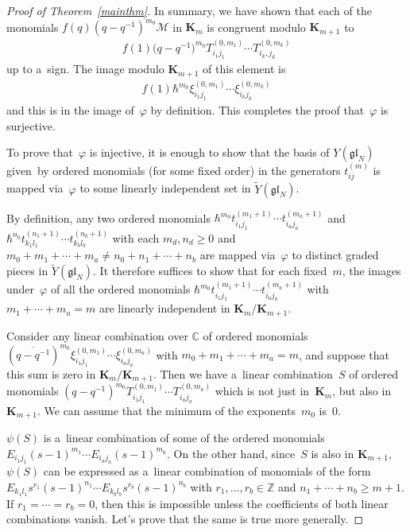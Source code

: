 \documentclass[11pt]{article}
\numberwithin{theorem}{section}
\numberwithin{proposition}{section}
\numberwithin{lemma}{section}
\numberwithin{corollary}{section}
\numberwithin{definition}{section}
\numberwithin{example}{section}
\numberwithin{remark}{section}
\numberwithin{note}{section}
\numberwithin{equation}{section}
\begin{document}
\begin{proof}[Proof of Theorem~\ref{mainthm}]
In summary, we have shown that each of the monomials $f(q)(q-q^{-1})^{m_0}\mathcal{M}$ in $\mathbf{K}_m$ is congruent
modulo $\mathbf{K}_{m+1}$ to
\begin{gather*}
f(1)\big(q-q^{-1}\big)^{m_0} T_{i_1 j_1}^{(0,m_1)} \cdots T_{i_k,j_k}^{(0,m_k)}
\end{gather*}
up to a~sign.
The image modulo $\mathbf{K}_{m+1}$ of this element is
\begin{gather*}
f(1)\hbar^{m_0}\xi_{i_1 j_1}^{(0,m_1)} \cdots \xi_{i_k j_k}^{(0,m_k)}
\end{gather*}
and this is in the image of~$\varphi$ by def\/inition.
This completes the proof that~$\varphi$ is surjective.

To prove that~$\varphi$ is injective, it is enough to show that the basis of $Y(\mathfrak{gl}_N)$ given~by
ordered monomials (for some f\/ixed order) in the generators $t_{ij}^{(m)}$ is mapped via~$\varphi$ to some linearly
independent set in $\widetilde{Y}(\mathfrak{gl}_N)$.

By def\/inition, any two ordered monomials $\hbar^{m_0}t_{i_1 j_1}^{(m_1+1)} \cdots t_{i_a j_a}^{(m_a+1)}$ and
$\hbar^{n_0}t_{k_1 l_1}^{(n_1+1)} \cdots t_{k_b l_b}^{(n_b+1)}$ with each $m_d, n_d \geq 0$ and $m_0+m_1+\cdots+m_a \neq
n_0+n_1 + \cdots + n_b$ are mapped via~$\varphi$ to distinct graded pieces in $\widetilde{Y}(\mathfrak{gl}_N)$.
It therefore suf\/f\/ices to show that for each f\/ixed~$m$, the images under~$\varphi$ of all the ordered monomials
$\hbar^{m_0} t_{i_1 j_1}^{(m_1+1)} \cdots t_{i_a j_a}^{(m_a+1)}$ with $m_1+\cdots+m_a=m$ are linearly independent in
$\mathbf{K}_m/\mathbf{K}_{m+1}$.

Consider any linear combination over $\mathbb{C}$ of ordered monomials $(\overline{q-q^{-1}})^{m_0}\xi_{i_1
j_1}^{(0,m_1)} \cdots \xi_{i_a j_a}^{(0,m_a)}$ with $m_0+m_1+\cdots+m_a=m$, and suppose that this sum is zero in
$\mathbf{K}_m/\mathbf{K}_{m+1}$.
Then we have a~linear combination~$S$ of ordered monomials $(q-q^{-1})^{m_0}T_{i_1 j_1}^{(0,m_1)} \cdots T_{i_a
j_a}^{(0,m_a)}$ which is not just in~$\mathbf{K}_m$, but also in~$\mathbf{K}_{m+1}$.
We can assume that the minimum of the exponents~$m_0$ is~$0$.

$\psi(S)$ is a~linear combination of some of the ordered monomials $E_{i_1 j_1}(s-1)^{m_1} \cdots E_{i_a j_a}
(s-1)^{m_a}$.
On the other hand, since~$S$ is also in $\mathbf{K}_{m+1}$, $\psi(S)$ can be expressed as a~linear combination of
monomials of the form $E_{k_1 l_1} s^{r_1} (s-1)^{n_1} \cdots E_{k_b l_b} s^{r_b} (s-1)^{n_b}$ with $r_1,\ldots,r_b \in
\mathbb{Z}$ and $n_1+\cdots+n_b \geq m+1$.
If $r_1 = \cdots = r_b=0$, then this is impossible unless the coef\/f\/icients of both linear combinations vanish.
Let's prove that the same is true more generally.


\end{proof}
\end{document}
